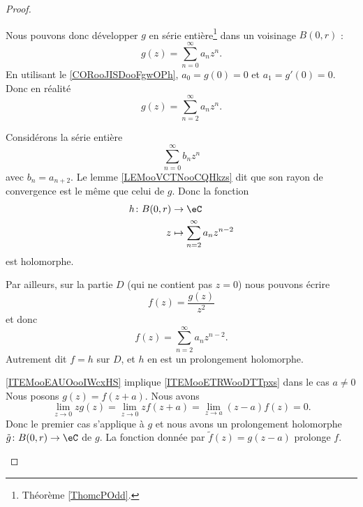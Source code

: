 \begin{proof}
\begin{subproof}
            Nous pouvons donc développer \( g\) en série entière\footnote{Théorème \ref{ThomcPOdd}.} dans un voisinage \( B(0,r)\) :
            \begin{equation}
                g(z)=\sum_{n=0}^{\infty}a_nz^n.
            \end{equation}
            En utilisant le \ref{CORooJISDooFgwOPh}, \( a_0=g(0)=0\) et \( a_1=g'(0)=0\). Donc en réalité
            \begin{equation}
                g(z)=\sum_{n=2}^{\infty}a_nz^n.
            \end{equation}

            Considérons la série entière
            \begin{equation}
                \sum_{n=0}^{\infty}b_nz^n
            \end{equation}
            avec \( b_n=a_{n+2}\). Le lemme \ref{LEMooVCTNooCQHkzs} dit que son rayon de convergence est le même que celui de \( g\). Donc la fonction
            \begin{equation}
                \begin{aligned}
                    h\colon B(0,r)&\to \eC \\
                    z&\mapsto \sum_{n=2}^{\infty}a_nz^{n-2} 
                \end{aligned}
            \end{equation}
            est holomorphe.
            
            Par ailleurs, sur la partie \( D\) (qui ne contient pas \( z=0\)) nous pouvons écrire
            \begin{equation}
                f(z)=\frac{ g(z) }{ z^2 }
            \end{equation}
            et donc
            \begin{equation}
                f(z)=\sum_{n=2}^{\infty}a_nz^{n-2}.
            \end{equation}
            Autrement dit \( f=h\) sur \( D\), et \( h\) en est un prolongement holomorphe.
        \item[\ref{ITEMooEAUOooIWcxHS} implique \ref{ITEMooETRWooDTTpxs} dans le cas \( a\neq 0\)]
            Nous posons \( g(z)=f(z+a)\). Nous avons
            \begin{equation}
                \lim_{z\to 0}zg(z)=\lim_{z\to 0}zf(z+a)=\lim_{z\to a}(z-a)f(z)=0.
            \end{equation}
            Donc le premier cas s'applique à \( g\) et nous avons un prolongement holomorphe \( \tilde g\colon B(0,r)\to \eC\) de \( g\). La fonction donnée par \( \tilde f(z)=g(z-a)\) prolonge \( f\).
    \end{subproof}
\end{proof}

